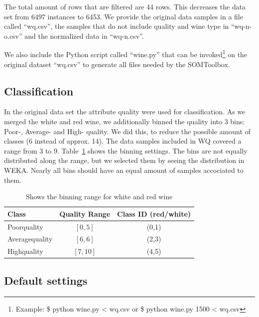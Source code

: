 \documentclass{acm_proc_article-sp}
\begin{document}
The total amount of rows that are filtered are 44 rows. This decreases the data set from 6497 instances to 6453.
We provide the original data samples in a file called ``wq.csv'', the samples that do not include quality and wine type
in ``wq-n-o.csv'' and the normalized data in ``wq-n.csv''.

We also include the Python script called ``wine.py'' that can be invoked\footnote{Example: \$ python wine.py < wq.csv or 
\$ python wine.py 1500 < wq.csv} on the original dataset ``wq.csv'' to generate all files needed by the SOMToolbox.

\subsection{Classification}

In the original data set the attribute quality were used for classification. As we merged the white and red wine,
we additionally binned the quality into 3 bins: Poor-, Average- and High- quality. We did this, to reduce the possible
amount of classes (6 instead of approx. 14).
The data samples included in WQ covered a range from 3 to 9. Table~\ref{tab:quality-binning} shows the binning settings.
The bins are not equally distributed along the range, but we selected them by seeing the distribution in WEKA. Nearly
all bins should have an equal amount of samples accociated to them.

\begin{table}
\centering
\begin{tabular}{l|c|c}
    Class & Quality Range & Class ID (red/white)\\
    \hline
    \hline
    Poorquality & $[0,5]$ & (0,1) \\
    \hline
    Averagequality & $[6,6]$ & (2,3) \\
    \hline
    Highquality & $[7,10]$ & (4,5) \\
    \hline
\end{tabular}
\caption{Shows the binning range for white and red wine}
\label{tab:quality-binning}
\end{table}

\subsection{Default settings}
\end{document}
